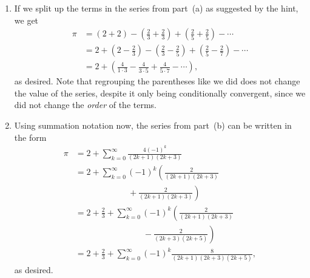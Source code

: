 \begin{multicols}{2}
\begin{itemize}[leftmargin=0em]
\begin{enumerate}[leftmargin=1.5em,label=\bf\color{ocre}(\alph*)]
			\item If we split up the terms in the series from part~(a) as suggested by the hint, we get
			\begin{align*}
				\pi & = (2 + 2) - \left(\frac{2}{3} + \frac{2}{3}\right) + \left(\frac{2}{5} + \frac{2}{5}\right) - \cdots \\
				& = 2 + \left(2 - \frac{2}{3}\right) - \left(\frac{2}{3} - \frac{2}{5}\right) + \left(\frac{2}{5} - \frac{2}{7}\right) - \cdots \\
				& = 2 + \left(\frac{4}{1\cdot 3} - \frac{4}{3\cdot 5} + \frac{4}{5\cdot 7} - \cdots\right),
			\end{align*}
			as desired. Note that regrouping the parentheses like we did does not change the value of the series, despite it only being conditionally convergent, since we did not change the \emph{order} of the terms.
			
			
			\clearpage
			
			
			\item Using summation notation now, the series from part~(b) can be written in the form
			\begin{align*}
				\pi & = 2 + \sum_{k=0}^\infty \frac{4(-1)^k}{(2k+1)(2k+3)} \\
				& = 2 + \sum_{k=0}^\infty (-1)^k\left(\frac{2}{(2k+1)(2k+3)}\right. \\
				& \qquad \qquad \qquad \ {} + \left.\frac{2}{(2k+1)(2k+3)}\right) \\
				& = 2 + \frac{2}{3} + \sum_{k=0}^\infty (-1)^k\left(\frac{2}{(2k+1)(2k+3)}\right. \\
				& \qquad \qquad \qquad \qquad {} - \left.\frac{2}{(2k+3)(2k+5)}\right) \\
				& = 2 + \frac{2}{3} + \sum_{k=0}^\infty (-1)^k\frac{8}{(2k+1)(2k+3)(2k+5)},
			\end{align*}
			as desired.
			

\end{enumerate}
\end{itemize}
\end{multicols}
